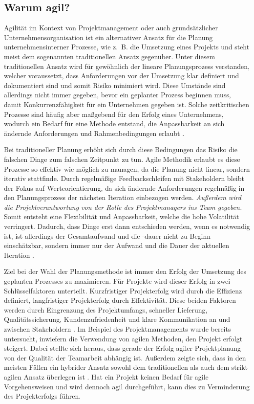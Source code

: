 \subsection{Warum agil?}
Agilität im Kontext von Projektmanagement oder auch grundsätzlicher Unternehmensorganisation ist ein alternativer Ansatz für die Planung unternehmensinterner Prozesse, wie z. B. die Umsetzung eines Projekts und steht meist dem sogenannten traditionellen Ansatz gegenüber. Unter diesem traditionellen Ansatz wird für gewöhnlich der lineare Planungsprozess verstanden, welcher voraussetzt, dass Anforderungen vor der Umsetzung klar definiert und dokumentiert sind und somit Risiko minimiert wird. Diese Umstände sind allerdings nicht immer gegeben, bevor ein geplanter Prozess beginnen muss, damit Konkurrenzfähigkeit für ein Unternehmen gegeben ist. Solche zeitkritischen Prozesse sind häufig aber maßgebend für den Erfolg eines Unternehmens, wodurch ein Bedarf für eine Methode entstand, die Anpassbarkeit an sich ändernde Anforderungen und Rahmenbedingungen erlaubt \cite{agilismVsTranditionalApproaches}.

Bei traditioneller Planung erhöht sich durch diese Bedingungen das Risiko die falschen Dinge zum falschen Zeitpunkt zu tun. Agile Methodik erlaubt es diese Prozesse so effektiv wie möglich zu managen, da die Planung nicht linear, sondern iterativ stattfinde. Durch regelmäßige Feedbackschleifen mit Stakeholdern bleibt der Fokus auf Werteorientierung, da sich ändernde Anforderungen regelmäßig in den Planungsprozess der nächsten Iteration einbezogen werden. \emph{Außerdem wird die Projektverantwortung von der Rolle des Projektmanagers ins Team gegeben.} Somit entsteht eine Flexibilität und Anpassbarkeit, welche die hohe Volatilität verringert. Dadurch, dass Dinge erst dann entschieden werden, wenn es notwendig ist, ist allerdings der Gesamtaufwand und die -dauer nicht zu Beginn einschätzbar, sondern immer nur der Aufwand und die Dauer der aktuellen Iteration \cite{agilismVsTranditionalApproaches}.

Ziel bei der Wahl der Planungsmethode ist immer den Erfolg der Umsetzung des geplanten Prozesses zu maximieren. Für Projekte wird dieser Erfolg in zwei Schlüsselfaktoren unterteilt. Kurzfristiger Projekterfolg wird durch die Effizienz definiert, langfristiger Projekterfolg durch Effektivität. Diese beiden Faktoren werden durch Eingrenzung des Projektumfangs, schneller Lieferung, Qualitätssicherung, Kundenzufriedenheit und klare Kommunikation an und zwischen Stakeholdern \cite{traditionalAndAgileOnProjectSuccess}. Im Beispiel des Projektmanagements wurde bereits untersucht, inwiefern die Verwendung von agilen Methoden, den Projekt erfolgt steigert. Dabei stellte sich heraus, dass gerade der Erfolg agiler Projektplanung von der Qualität der Teamarbeit abhängig ist.
Außerdem zeigte sich, dass in den meisten Fällen ein hybrider Ansatz sowohl dem traditionellen als auch dem strikt agilen Ansatz überlegen ist \cite{traditionalAndAgileOnProjectSuccess}.
Hat ein Projekt keinen Bedarf für agile Vorgehensweisen und wird dennoch agil durchgeführt, kann dies zu Verminderung des Projekterfolgs führen. 

